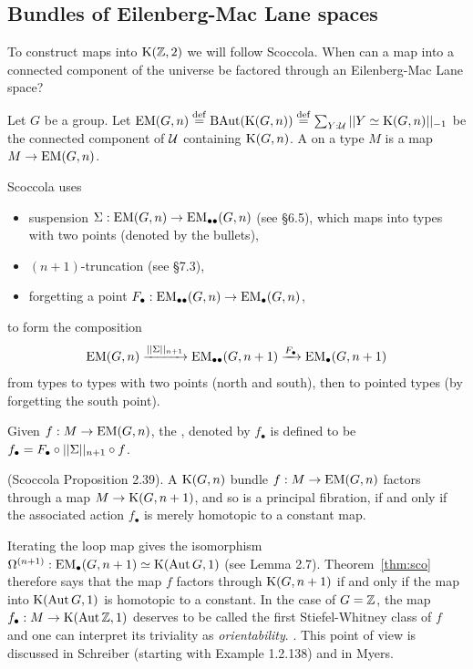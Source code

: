 \subsection{Bundles of Eilenberg-Mac Lane spaces}

To construct maps into \( \mathrm{K}(\mathbb{Z},2) \) we will follow Scoccola\cite{sco}. When can a map into a connected component of the universe be factored through an Eilenberg-Mac Lane space?

\begin{mydef}
Let \( G \) be a group. Let \( \mathrm{EM}(G,n)\stackrel{\mathrm{def}}{=} \operatorname{BAut}(\mathrm{K}(G,n))\stackrel{\mathrm{def}}{=} \sum_{Y:\mathcal{U}}||Y\simeq \mathrm{K}(G,n)||_{-1}\) be the connected component of \( \mathcal{U} \) containing \( \mathrm{K}(G,n) \). A  on a type \( M \) is a map \( M\to\mathrm{EM}(G,n) \).
\end{mydef}

Scoccola uses 
\begin{itemize}
\item suspension \( \Sigma:\mathrm{EM}(G,n)\to\mathrm{EM}_{\bullet\bullet}(G,n) \) (see \cite{hottbook} §6.5), which maps into types with two points (denoted by the bullets),
\item \( (n+1) \)-truncation (see \cite{hottbook} §7.3),
\item forgetting a point \( F_\bullet:\mathrm{EM}_{\bullet\bullet}(G,n)\to \mathrm{EM}_{\bullet}(G,n) \),
\end{itemize}
to form the composition
\[ 
\mathrm{EM}(G,n)\xrightarrow[]{||\Sigma||_{n+1}} \mathrm{EM}_{\bullet\bullet}(G,n+1)\xrightarrow[]{F_\bullet}\mathrm{EM_{\bullet}}(G,n+1)
\]
from types to types with two points (north and south), then to pointed types (by forgetting the south point).

\begin{mydef}
Given \( f:M\to\mathrm{EM}(G,n) \), the , denoted by \( f_\bullet \) is defined to be \( f_\bullet=F_\bullet\circ||\Sigma||_{n+1}\circ f \).
\end{mydef}

\begin{mythm}
\label{thm:sco}
(Scoccola\cite{sco} Proposition 2.39). A \( \mathrm{K}(G,n) \) bundle \( f:M\to\mathrm{EM}(G,n) \) factors through a map \( M\to\mathrm{K}(G,n+1) \), and so is a principal fibration, if and only if the associated action \( f_\bullet \) is merely homotopic to a constant map.
\end{mythm}

\begin{mynote}
Iterating the loop map gives the isomorphism \( \Omega^{(n+1)}:\mathrm{EM_{\bullet}}(G,n+1)\simeq \mathrm{K}(\operatorname{Aut} G,1) \) (see \cite{sco} Lemma 2.7). Theorem~\ref{thm:sco} therefore says that the map \( f \) factors through \( \mathrm{K}(G,n+1) \) if and only if the map into \( \mathrm{K}(\operatorname{Aut} G,1) \) is homotopic to a constant. In the case of \( G=\mathbb{Z} \), the map \( f_\bullet:M\to \mathrm{K}(\operatorname{Aut} \mathbb{Z}, 1) \) deserves to be called the first Stiefel-Whitney class of \( f \) and one can interpret its triviality as \emph{orientability}. . This point of view is discussed in Schreiber\cite{dcct} (starting with Example 1.2.138) and in Myers\cite{myersgood}.
\end{mynote}

